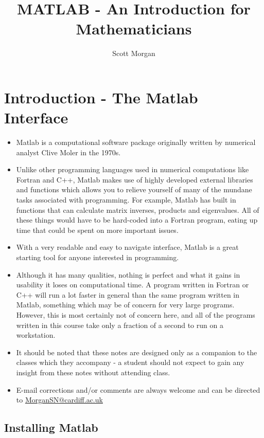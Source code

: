 \documentclass[12pt]{report}
\title{MATLAB - An Introduction for Mathematicians}
\author{Scott Morgan}
\begin{document}
\maketitle

\section*{Introduction - The Matlab Interface}

\begin{itemize}
\item Matlab is a computational software package originally written by numerical analyst Clive Moler in the 1970s. 
\item Unlike other programming languages used in numerical computations like Fortran and C++, Matlab makes use of highly developed external libraries and functions which allows you to relieve yourself of many of the mundane tasks associated with programming. For example, Matlab has built in functions that can calculate matrix inverses, products and eigenvalues. All of these things would have to be hard-coded into a Fortran program, eating up time that could be spent on more important issues. 
\item With a very readable and easy to navigate interface, Matlab is a great starting tool for anyone interested in programming. 
\item Although it has many qualities, nothing is perfect and what it gains in usability it loses on computational time. A program written in Fortran or C++ will run a lot faster in general than the same program written in Matlab, something which may be of concern for very large programs. However, this is most certainly not of concern here, and all of the programs written in this course take only a fraction of a second to run on a workstation.
\item It should be noted that these notes are designed only as a companion to the classes which they accompany - a student should not expect to gain any insight from these notes without attending class.
\item E-mail corrections and/or comments are always welcome and can be directed to \url{MorganSN@cardiff.ac.uk}
\end{itemize}


\subsection*{Installing Matlab}
\end{document}

